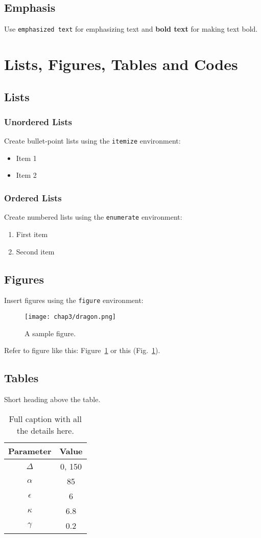 \subsection{Emphasis}
Use \texttt{emphasized text} for emphasizing text and \textbf{bold text} for making text bold.

\section{Lists, Figures, Tables and Codes}
\subsection{Lists}
\subsubsection{Unordered Lists}
Create bullet-point lists using the \texttt{itemize} environment:
\begin{itemize}
  \item Item 1
  \item Item 2
\end{itemize}

\subsubsection{Ordered Lists}
Create numbered lists using the \texttt{enumerate} environment:
\begin{enumerate}
  \item First item
  \item Second item
\end{enumerate}

\subsection{Figures}
Insert figures using the \texttt{figure} environment:
\begin{figure}[H]
  \centering
  \texttt{[image: chap3/dragon.png]} 
  \caption{A sample figure.}
  \label{fig:sample}
\end{figure}

Refer to figure like this: Figure~\ref{fig:sample} or this (Fig.~\ref{fig:sample}). 


\subsection{Tables}
\begin{table}[H] 
    \center
    \caption{Short heading above the table.}
    \begin{tabular}{c|c}
    Parameter & Value \\ \hline \hline
    $\Delta$ & 0, 150 \\
    ${\alpha}$ & 85 \\
    ${\epsilon}$ & 6 \\
    ${\kappa}$ & 6.8 \\
    ${\gamma}$ & 0.2
    \end{tabular}
    \label{tab:values}
    \caption*{Full caption with all the details here.}
    \end{table}
    
